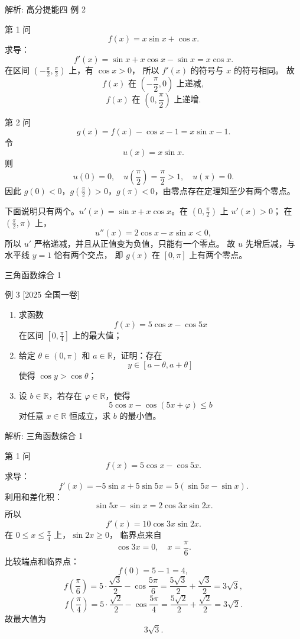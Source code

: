 ﻿\documentclass[aspectratio=169,10pt]{ctexbeamer}
\begin{document}
\begin{frame}[t,allowframebreaks]{解析: 高分提能四 例 2}
\tiny
\begin{block}{第 1 问}
\[
f(x)=x\sin x+\cos x.
\]
求导：
\[
f'(x)=\sin x+x\cos x-\sin x=x\cos x.
\]
在区间 $\left(-\frac\pi2,\frac\pi2\right)$ 上，有 $\cos x>0$，
所以 $f'(x)$ 的符号与 $x$ 的符号相同。
故
\[
f(x)\text{ 在 }\left(-\frac\pi2,0\right)\text{ 上递减},
\]
\[
f(x)\text{ 在 }\left(0,\frac\pi2\right)\text{ 上递增}.
\]
\end{block}
\begin{block}{第 2 问}
\[
g(x)=f(x)-\cos x-1=x\sin x-1.
\]
令
\[
u(x)=x\sin x.
\]
则
\[
u(0)=0,\quad u\left(\frac\pi2\right)=\frac\pi2>1,\quad u(\pi)=0.
\]
因此 $g(0)<0$，$g(\frac\pi2)>0$，$g(\pi)<0$，由零点存在定理知至少有两个零点。

下面说明只有两个。$u'(x)=\sin x+x\cos x$。在 $(0,\frac\pi2)$ 上 $u'(x)>0$；
在 $(\frac\pi2,\pi)$ 上，
\[
u''(x)=2\cos x-x\sin x<0,
\]
所以 $u'$ 严格递减，并且从正值变为负值，只能有一个零点。
故 $u$ 先增后减，与水平线 $y=1$ 恰有两个交点，
即 $g(x)$ 在 $[0,\pi]$ 上有两个零点。
\end{block}
\end{frame}

\begin{frame}[t,shrink=10]{三角函数综合 1}
\normalsize
\begin{block}{例 3}
[2025 全国一卷]
\begin{enumerate}
  \item 求函数
  \[
  f(x)=5\cos x-\cos 5x
  \]
  在区间 $\left[0,\frac{\pi}{4}\right]$ 上的最大值；
  \item 给定 $\theta\in(0,\pi)$ 和 $a\in\mathbb{R}$，证明：存在
  \[
  y\in[a-\theta,a+\theta]
  \]
  使得 $\cos y>\cos\theta$；
  \item 设 $b\in\mathbb{R}$，若存在 $\varphi\in\mathbb{R}$，使得
  \[
  5\cos x-\cos(5x+\varphi)\le b
  \]
  对任意 $x\in\mathbb{R}$ 恒成立，求 $b$ 的最小值。
\end{enumerate}
\end{block}
\end{frame}

\begin{frame}[t]{解析: 三角函数综合 1}
\tiny
\begin{block}{第 1 问}
\[
f(x)=5\cos x-\cos5x.
\]
求导：
\[
f'(x)=-5\sin x+5\sin5x=5(\sin5x-\sin x).
\]
利用和差化积：
\[
\sin5x-\sin x=2\cos3x\sin2x.
\]
所以
\[
f'(x)=10\cos3x\sin2x.
\]
在 $0\le x\le\frac\pi4$ 上，$\sin2x\ge0$，
临界点来自
\[
\cos3x=0,\quad x=\frac\pi6.
\]
比较端点和临界点：
\[
f(0)=5-1=4,
\]
\[
f\left(\frac\pi6\right)=5\cdot\frac{\sqrt3}{2}-\cos\frac{5\pi}{6}
=\frac{5\sqrt3}{2}+\frac{\sqrt3}{2}=3\sqrt3,
\]
\[
f\left(\frac\pi4\right)=5\cdot\frac{\sqrt2}{2}-\cos\frac{5\pi}{4}
=\frac{5\sqrt2}{2}+\frac{\sqrt2}{2}=3\sqrt2.
\]
故最大值为
\[
3\sqrt3.
\]
\end{block}
\end{frame}
\end{document}
